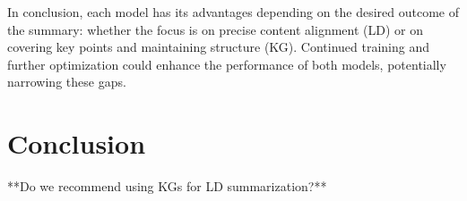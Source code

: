 \documentclass[12pt]{article}
\begin{document}
In conclusion, each model has its advantages depending on the desired outcome of the summary: whether the focus is on precise content alignment (LD) or on covering key points and maintaining structure (KG). Continued training and further optimization could enhance the performance of both models, potentially narrowing these gaps.

\section{Conclusion}
**Do we recommend using KGs for LD summarization?**

\newpage
\printbibliography
\end{document}

